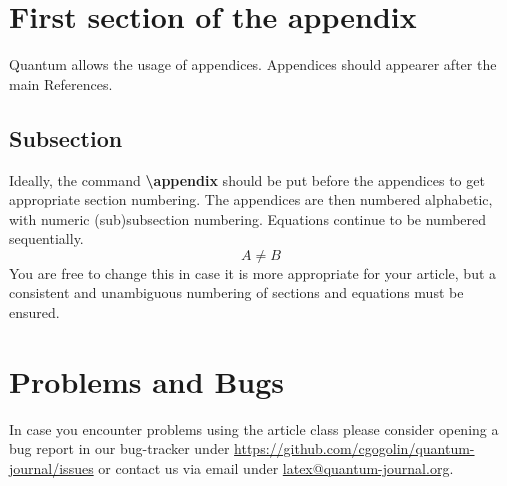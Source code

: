 \documentclass[prx,a4paper,aps,twocolumn,superscriptaddress,11p]{quantumarticle}
\begin{document}
\appendix

\section{First section of the appendix}
Quantum allows the usage of appendices.
Appendices should appearer after the main References.

\subsection{Subsection}
Ideally, the command \textbf{\textbackslash{}appendix} should be put before the appendices to get appropriate section numbering.
The appendices are then numbered alphabetic, with numeric (sub)subsection numbering.
Equations continue to be numbered sequentially. 
\begin{equation}
  A \neq B
\end{equation}
You are free to change this in case it is more appropriate for your article, but a consistent and unambiguous numbering of sections and equations must be ensured.

\section{Problems and Bugs}
In case you encounter problems using the article class please consider opening a bug report in our bug-tracker under \href{https://github.com/cgogolin/quantum-journal/issues}{https://github.com/cgogolin/quantum-journal/issues} or contact us via email under \href{mailto:latex@quantum-journal.org}{latex@quantum-journal.org}. 
\end{document}
